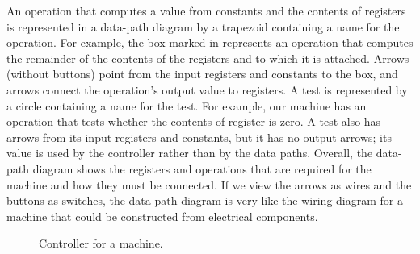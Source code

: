 An operation that computes a value from constants and the contents of registers
is represented in a data-path diagram by a trapezoid containing a name for the
operation.  For example, the box marked  in 
represents an operation that computes the remainder of the contents of the
registers  and  to which it is attached.  Arrows (without
buttons) point from the input registers and constants to the box, and arrows
connect the operation's output value to registers.  A test is represented by a
circle containing a name for the test.  For example, our  machine
has an operation that tests whether the contents of register  is zero.
A test also has arrows from its input registers and constants, but it has no
output arrows; its value is used by the controller rather than by the data
paths.  Overall, the data-path diagram shows the registers and operations that
are required for the machine and how they must be connected.  If we view the
arrows as wires and the  buttons as switches, the data-path diagram is
very like the wiring diagram for a machine that could be constructed from
electrical components.

\begin{figure}[tb]
\label{Figure 5.2}
\centering
\begin{comment}
\heading{Figure 5.2:} Controller for a \acronym{GCD} machine.

\begin{example}
     start
       |
       V
      / \ yes
+--->< = >-----> done
|     \ /
|      | no
|      V
|  +------+
|  | t<-r |
|  +---+--+
|      |
|      V
|  +------+
|  | a<-b |
|  +---+--+
|      |
|      V
|  +------+
+--+ b<-t |
   +------+
\end{example}
\end{comment}

\par\bigskip
\noindent
{} Controller for a  machine.
\end{figure}

